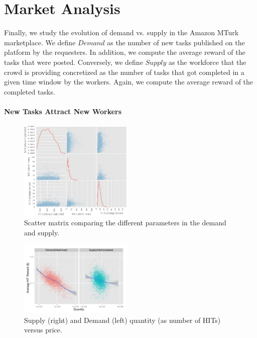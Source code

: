 \section{Market Analysis}
\label{sec:market}
Finally, we study the evolution of demand vs. supply in the Amazon MTurk marketplace. We define $Demand$ as the number of new tasks published on the platform by the requesters. In addition, we compute the average reward of the tasks that were posted. Conversely, we define $Supply$ as the workforce that the crowd is providing concretized as the number of tasks that got completed in a given time window by the workers. Again, we compute the average reward of the completed tasks.


\paragraph{New Tasks Attract New Workers}
\begin{figure}[tb]
	\centering
		\includegraphics[width=0.48\textwidth]{figures/scatter}
	\caption{Scatter matrix comparing the different parameters in the demand and supply.}
	\label{fig:scatter_matrix}
\end{figure}
\begin{figure}[tb]
	\centering
		\includegraphics[width=0.48\textwidth]{figures/ds}
	\caption{Supply (right) and Demand (left) quantity (as number of HITs) versus price.}
	\label{fig:dsup}
\end{figure}
